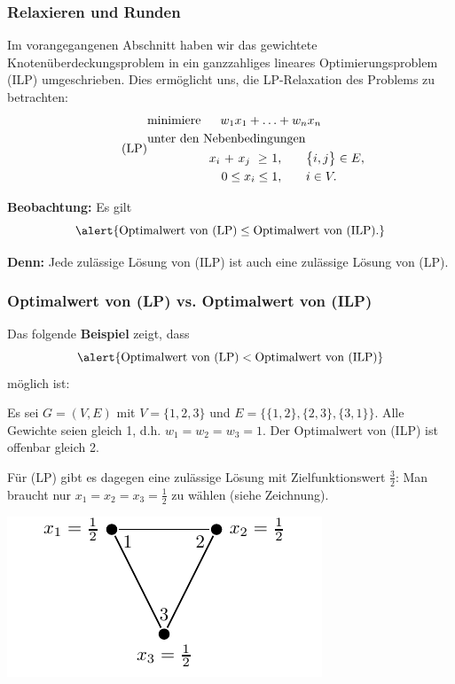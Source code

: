 \documentclass[smaller]{beamer}
\begin{document}
\begin{frame}
\frametitle{Relaxieren und Runden}
 Im vorangegangenen Abschnitt haben wir das gewichtete Knotenüberdeckungsproblem in ein \alert{ganzzahliges lineares Optimierungsproblem (ILP)} umgeschrieben. Dies ermöglicht uns, die \alert{LP-Relaxation} des Problems zu betrachten:
\begin{align}
\tag{LP}
\begin{alignedat}{5}
& \text{minimiere } & \rlap{$w_1x_1 + \ldots + w_nx_n$} & & & & & \\
& \rlap{unter den Nebenbedingungen} & & & & & & \\
&&\ x_i &\ + &\ x_j &\ \geq &\ 1, & \qquad \bigl\{ i,j \bigr\} \in E, \\
&&\     &\   &\  &\  &\ \llap{$0 \leq x_i \leq 1,$} & \qquad i \in V. \\
\end{alignedat}
\end{align}

\textbf{Beobachtung:} Es gilt
\begin{equation}
\label{eq:11:8}
\alert{\text{Optimalwert von (LP)} \leq \text{Optimalwert von (ILP)}.}
\end{equation}

\textbf{Denn:} Jede zulässige Lösung von (ILP) ist auch eine zulässige Lösung von (LP).
\end{frame}

\begin{frame}
 \frametitle{Optimalwert von (LP) vs. Optimalwert von (ILP)}
  Das folgende \textbf{Beispiel} zeigt, dass
  \begin{equation*}
    \alert{\text{Optimalwert von (LP)} < \text{Optimalwert von (ILP)}}
   \end{equation*}
   möglich ist: \\ \vspace*{0.2cm}
  
  Es sei $G=(V,E)$ mit $V = \big\{ 1,2,3 \big\}$ und $E = \big\{ \{ 1,2\}, \{2,3\}, \{3,1\} \big\}$. Alle Gewichte seien gleich 1, d.h. $w_1=w_2=w_3=1$. Der Optimalwert von (ILP) ist offenbar gleich 2. \\ \vspace*{0.2cm}
  
  Für (LP) gibt es dagegen eine zulässige Lösung mit Zielfunktionswert $\frac{3}{2}$: Man braucht nur $x_1 = x_2 = x_3 = \frac{1}{2}$ zu wählen (siehe Zeichnung).

\begin{center}
\includegraphics{fig62.pdf}
\end{center}
\end{frame}
\end{document}
